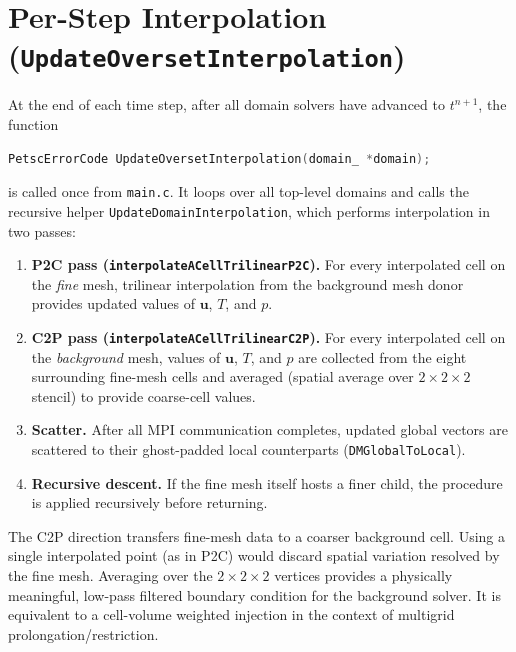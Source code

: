 \documentclass[12pt,a4paper]{article}
\begin{document}
\section{Per-Step Interpolation (\texttt{UpdateOversetInterpolation})}
\label{sec:overset-update}

At the end of each time step, after all domain solvers have advanced to
$t^{n+1}$, the function

\begin{lstlisting}[language=C, style=cstyle]
PetscErrorCode UpdateOversetInterpolation(domain_ *domain);
\end{lstlisting}

is called once from \texttt{main.c}.  It loops over all top-level
domains and calls the recursive helper \texttt{UpdateDomainInterpolation},
which performs interpolation in two passes:

\begin{enumerate}
  \item \textbf{P2C pass (\texttt{interpolateACellTrilinearP2C}).}
        For every interpolated cell on the \emph{fine} mesh, trilinear
        interpolation from the background mesh donor provides updated
        values of $\mathbf{u}$, $T$, and $p$.

  \item \textbf{C2P pass (\texttt{interpolateACellTrilinearC2P}).}
        For every interpolated cell on the \emph{background} mesh, values
        of $\mathbf{u}$, $T$, and $p$ are collected from the eight
        surrounding fine-mesh cells and averaged (spatial average over
        $2\times2\times2$ stencil) to provide coarse-cell values.

  \item \textbf{Scatter.}
        After all MPI communication completes, updated global vectors are
        scattered to their ghost-padded local counterparts
        (\texttt{DMGlobalToLocal}).

  \item \textbf{Recursive descent.}
        If the fine mesh itself hosts a finer child, the procedure is
        applied recursively before returning.
\end{enumerate}

\begin{notebox}
  The C2P direction transfers fine-mesh data to a coarser background
  cell.  Using a single interpolated point (as in P2C) would discard
  spatial variation resolved by the fine mesh.  Averaging over the
  $2\times2\times2$ vertices provides a physically meaningful, low-pass
  filtered boundary condition for the background solver.  It is
  equivalent to a cell-volume weighted injection in the context of
  multigrid prolongation/restriction.
\end{notebox}
\end{document}
